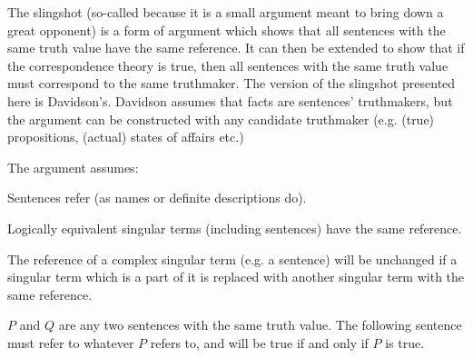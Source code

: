 The slingshot (so-called because it is a small argument meant to bring down a great opponent) is a form of argument which shows that all sentences with the same truth value have the same reference.
It can then be extended to show that if the correspondence theory is true, then all sentences with the same truth value must correspond to the same truthmaker.
The version of the slingshot presented here is Davidson's.
\parencite[753]{Davidson_1969}
Davidson assumes that facts are sentences' truthmakers, but the argument can be constructed with any candidate truthmaker (e.g. (true) propositions, (actual) states of affairs etc.)
\parencite[752]{Davidson_1969}

The argument assumes:
\parencite[753]{Davidson_1969}

	\begin{thesis} \label{srefer}
	Sentences refer (as names or definite descriptions do).
	\end{thesis}


	\begin{thesis} \label{sameref}
	Logically equivalent singular terms (including sentences) have the same reference.
	\end{thesis}


	\begin{thesis} \label{constref}
	The reference of a complex singular term (e.g. a sentence) will be unchanged if a singular term which is a part of it is replaced with another singular term with the same reference.
	\end{thesis}

$P$ and $Q$ are any two sentences with the same truth value.
The following sentence must refer to whatever $P$ refers to, and will be true if and only if $P$ is true.

